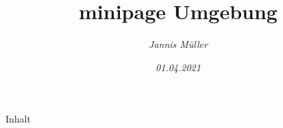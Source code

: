 \documentclass[a4paper, 15pt]{article}
\title{minipage Umgebung}
\date{\slshape 01.04.2021}
\author{\slshape Jannis Müller}
\begin{document}
Inhalt
\end{document}
